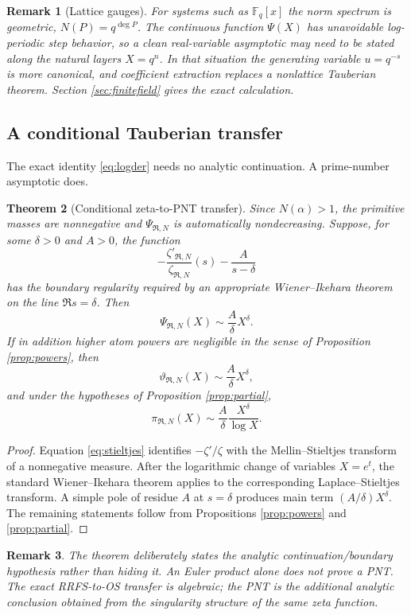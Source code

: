 \documentclass[11pt]{article}
\newtheorem{theorem}{Theorem}[section]
\newtheorem{remark}[theorem]{Remark}
\newcommand{\FF}{\mathbb F}
\newcommand{\cR}{\mathfrak R}
\begin{document}
\begin{remark}[Lattice gauges]
For systems such as $\FF_q[x]$ the norm spectrum is geometric, $N(P)=q^{\deg P}$. The continuous function $\Psi(X)$ has unavoidable log-periodic step behavior, so a clean real-variable asymptotic may need to be stated along the natural layers $X=q^n$. In that situation the generating variable $u=q^{-s}$ is more canonical, and coefficient extraction replaces a nonlattice Tauberian theorem. Section \ref{sec:finitefield} gives the exact calculation.
\end{remark}

\subsection{A conditional Tauberian transfer}

The exact identity \eqref{eq:logder} needs no analytic continuation. A prime-number asymptotic does.

\begin{theorem}[Conditional zeta-to-PNT transfer]\label{thm:tauber}
Since $N(\alpha)>1$, the primitive masses are nonnegative and $\Psi_{\cR,N}$ is automatically nondecreasing. Suppose, for some $\delta>0$ and $A>0$, the function
\[
-\frac{\zeta'_{\cR,N}}{\zeta_{\cR,N}}(s)-\frac{A}{s-\delta}
\]
has the boundary regularity required by an appropriate Wiener--Ikehara theorem on the line $\Re s=\delta$. Then
\[
\boxed{
\Psi_{\cR,N}(X)\sim \frac{A}{\delta}X^\delta.}
\]
If in addition higher atom powers are negligible in the sense of Proposition \ref{prop:powers}, then
\[
\vartheta_{\cR,N}(X)\sim \frac{A}{\delta}X^\delta,
\]
and under the hypotheses of Proposition \ref{prop:partial},
\[
\pi_{\cR,N}(X)
\sim
\frac{A}{\delta}\frac{X^\delta}{\log X}.
\]
\end{theorem}

\begin{proof}
Equation \eqref{eq:stieltjes} identifies $-\zeta'/\zeta$ with the Mellin--Stieltjes transform of a nonnegative measure. After the logarithmic change of variables $X=e^t$, the standard Wiener--Ikehara theorem applies to the corresponding Laplace--Stieltjes transform. A simple pole of residue $A$ at $s=\delta$ produces main term $(A/\delta)X^\delta$. The remaining statements follow from Propositions \ref{prop:powers} and \ref{prop:partial}.
\end{proof}

\begin{remark}
The theorem deliberately states the analytic continuation/boundary hypothesis rather than hiding it. An Euler product alone does not prove a PNT. The exact RRFS-to-OS transfer is algebraic; the PNT is the additional analytic conclusion obtained from the singularity structure of the same zeta function.
\end{remark}
\end{document}
